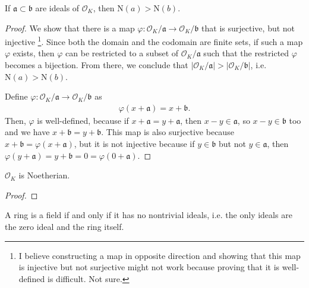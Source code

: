 \begin{thmbox}
    \begin{lemma}
        If \(\mathfrak{a} \subset \mathfrak{b}\) are ideals of \(\mathcal{O}_K\), then \(\mathrm{N}(a) > \mathrm{N}(b)\).
    \end{lemma}
\end{thmbox}
\begin{proof}
    We show that there is a map \(\varphi: \mathcal{O}_K / \mathfrak{a} \longrightarrow \mathcal{O}_K / \mathfrak{b}\) that is surjective, but not injective \footnote{I believe constructing a map in opposite direction and showing that this map is injective but not surjective might not work because proving that it is well-defined is difficult. Not sure.}. Since both the domain and the codomain are finite sets, if such a map \(\varphi\) exists, then \(\varphi\) can be restricted to a subset of \(\mathcal{O}_K / \mathfrak{a}\) such that the restricted \(\varphi\) becomes a bijection. From there, we conclude that \(|\mathcal{O}_K / \mathfrak{a}| > |\mathcal{O}_K / \mathfrak{b}|\), i.e. \(\mathrm{N}(a) > \mathrm{N}(b)\).

    Define \(\varphi: \mathcal{O}_K / \mathfrak{a} \longrightarrow \mathcal{O}_K / \mathfrak{b}\) as
    \begin{align*}
        \varphi(x + \mathfrak{a}) = x + \mathfrak{b} \text{.}
    \end{align*}
    Then, \(\varphi\) is well-defined, because if \(x + \mathfrak{a} = y + \mathfrak{a}\), then \(x - y \in \mathfrak{a}\), so \(x - y \in \mathfrak{b}\) too and we have \(x + \mathfrak{b} = y + \mathfrak{b}\). This map is also surjective because \(x + \mathfrak{b} = \varphi(x + \mathfrak{a})\), but it is not injective because if \(y \in \mathfrak{b}\) but not \(y \in \mathfrak{a}\), then \(\varphi(y + \mathfrak{a}) = y + \mathfrak{b} = 0 = \varphi(0 + \mathfrak{a})\).
\end{proof}

\begin{thmbox}
    \begin{lemma}
        \(\mathcal{O}_K\) is Noetherian.
    \end{lemma}
\end{thmbox}
\begin{proof}
    
\end{proof}

\begin{thmbox}
    \begin{lemma}
        A ring is a field if and only if it has no nontrivial ideals, i.e. the only ideals are the zero ideal and the ring itself.
    \end{lemma}
\end{thmbox}

